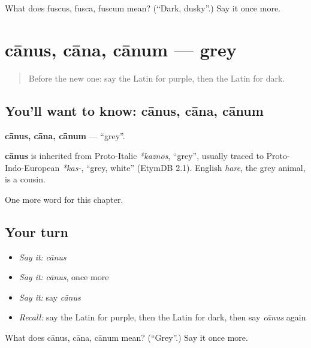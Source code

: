 \begin{tcolorbox}[breakable,colback=teal!4,colframe=teal!35!black,title={Before you move on}]
What does fuscus, fusca, fuscum mean? (\textquotedblleft{}Dark, dusky\textquotedblright{}.) Say it once more.
\end{tcolorbox}
\section[cānus, cāna, cānum]{cānus, cāna, cānum — grey}

\label{lesson:LA-C149-canus}



\begin{quote}
Before the new one: say the Latin for purple, then the Latin for dark.
\end{quote}

\subsection*{You'll want to know: cānus, cāna, cānum}
\textbf{cānus, cāna, cānum} — \textquotedblleft{}grey\textquotedblright{}.

\begin{cousinweb}
\textbf{cānus} is inherited from Proto-Italic \emph{*kaznos}, \textquotedblleft{}grey\textquotedblright{}, usually traced to Proto-Indo-European \emph{*kas-}, \textquotedblleft{}grey, white\textquotedblright{} (EtymDB 2.1). English \emph{hare}, the grey animal, is a cousin.
\end{cousinweb}

\begin{grammarlens}[title={What you've built}]
One more word for this chapter.
\end{grammarlens}

\subsection*{Your turn}
\begin{itemize}
\raggedright
  \item \emph{Say it:} \emph{cānus}
  \item \emph{Say it:} \emph{cānus}, once more
  \item \emph{Say it:} say \emph{cānus}
  \item \emph{Recall:} say the Latin for purple, then the Latin for dark, then say \emph{cānus} again
\end{itemize}

\begin{tcolorbox}[breakable,colback=teal!4,colframe=teal!35!black,title={Before you move on}]
What does cānus, cāna, cānum mean? (\textquotedblleft{}Grey\textquotedblright{}.) Say it once more.
\end{tcolorbox}
